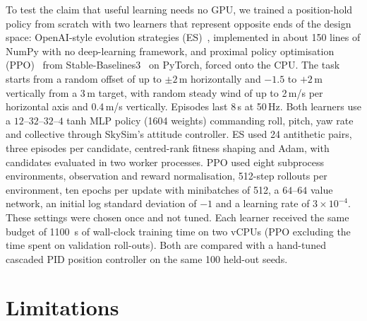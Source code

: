 \documentclass{ieeeaccess}
\newcommand{\skysim}{SkySim\xspace}
\begin{document}
To test the claim that useful learning needs no GPU, we trained a position-hold
policy from scratch with two learners that represent opposite ends of the
design space: OpenAI-style evolution strategies (ES)~\cite{salimans2017es},
implemented in about 150 lines of NumPy with no deep-learning framework, and
proximal policy optimisation (PPO)~\cite{schulman2017ppo} from
Stable-Baselines3~\cite{raffin2021sb3} on PyTorch, forced onto the CPU. The
task starts from a random offset of up to $\pm2$\,m horizontally and $-1.5$ to
$+2$\,m vertically from a 3\,m target, with
random steady wind of up to 2\,m/s per horizontal axis and 0.4\,m/s vertically.
Episodes last 8\,s at 50\,Hz. Both learners use a $12$--$32$--$32$--$4$ tanh
MLP policy (\num{1604} weights) commanding roll, pitch, yaw rate and collective
through \skysim's attitude controller. ES used 24 antithetic pairs, three
episodes per candidate, centred-rank fitness shaping and Adam, with candidates
evaluated in two worker processes. PPO used eight subprocess environments,
observation and reward normalisation, 512-step rollouts per environment, ten
epochs per update with minibatches of 512, a $64$--$64$ value network, an
initial log standard deviation of $-1$ and a learning rate of
$3\times10^{-4}$. These settings were chosen once and not tuned. Each learner received the same budget of
\SI{1100}{s} of wall-clock training time on two vCPUs (PPO excluding the time
spent on validation roll-outs). Both are compared with a hand-tuned cascaded
PID position controller on the same 100 held-out seeds.



\section{Limitations}
\label{sec:limits}
\end{document}
